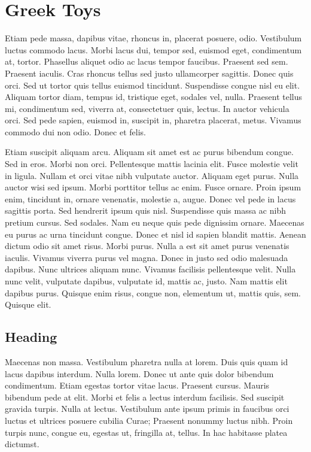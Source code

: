 \section{Greek Toys}
Etiam pede massa, dapibus vitae, rhoncus in, placerat posuere, odio. Vestibulum luctus
commodo lacus. Morbi lacus dui, tempor sed, euismod eget, condimentum at, tortor.
Phasellus aliquet odio ac lacus tempor faucibus. Praesent sed sem. Praesent iaculis. Cras
rhoncus tellus sed justo ullamcorper sagittis. Donec quis orci. Sed ut tortor quis tellus
euismod tincidunt. Suspendisse congue nisl eu elit. Aliquam tortor diam, tempus id, tristique
eget, sodales vel, nulla. Praesent tellus mi, condimentum sed, viverra at, consectetuer quis,
lectus. In auctor vehicula orci. Sed pede sapien, euismod in, suscipit in, pharetra placerat,
metus. Vivamus commodo dui non odio. Donec et felis.

Etiam suscipit aliquam arcu. Aliquam sit amet est ac purus bibendum congue. Sed in eros.
Morbi non orci. Pellentesque mattis lacinia elit. Fusce molestie velit in ligula. Nullam et
orci vitae nibh vulputate auctor. Aliquam eget purus. Nulla auctor wisi sed ipsum. Morbi
porttitor tellus ac enim. Fusce ornare. Proin ipsum enim, tincidunt in, ornare venenatis,
molestie a, augue. Donec vel pede in lacus sagittis porta. Sed hendrerit ipsum quis nisl.
Suspendisse quis massa ac nibh pretium cursus. Sed sodales. Nam eu neque quis pede
dignissim ornare. Maecenas eu purus ac urna tincidunt congue.
Donec et nisl id sapien blandit mattis. Aenean dictum odio sit amet risus. Morbi purus.
Nulla a est sit amet purus venenatis iaculis. Vivamus viverra purus vel magna. Donec in
justo sed odio malesuada dapibus. Nunc ultrices aliquam nunc. Vivamus facilisis pellentesque
velit. Nulla nunc velit, vulputate dapibus, vulputate id, mattis ac, justo. Nam mattis elit
dapibus purus. Quisque enim risus, congue non, elementum ut, mattis quis, sem. Quisque
elit.

\subsection{Heading}
Maecenas non massa. Vestibulum pharetra nulla at lorem. Duis quis quam id lacus dapibus
interdum. Nulla lorem. Donec ut ante quis dolor bibendum condimentum. Etiam egestas
tortor vitae lacus. Praesent cursus. Mauris bibendum pede at elit. Morbi et felis a lectus
interdum facilisis. Sed suscipit gravida turpis. Nulla at lectus. Vestibulum ante ipsum
primis in faucibus orci luctus et ultrices posuere cubilia Curae; Praesent nonummy luctus
nibh. Proin turpis nunc, congue eu, egestas ut, fringilla at, tellus. In hac habitasse platea
dictumst.

